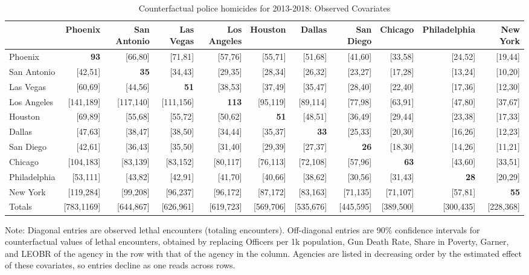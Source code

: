 \begin{table}[h!]\centering\scriptsize\tabcolsep=0.1cm\caption{Counterfactual police homicides for 2013-2018: Observed Covariates} \label{table:bootstrap_counterfactual_obs}\begin{tabular}{lrrrrrrrrrr}\hline \hline&Phoenix&San Antonio&Las Vegas&Los Angeles&Houston&Dallas&San Diego&Chicago&Philadelphia&New York\\
\hline
Phoenix&\textbf{93}&[66,80]&[71,81]&[57,76]&[55,71]&[51,68]&[41,60]&[33,58]&[24,52]&[19,44]\\
San Antonio&[42,51]&\textbf{35}&[34,43]&[29,35]&[28,34]&[26,32]&[23,27]&[17,28]&[13,24]&[10,20]\\
Las Vegas&[60,69]&[44,56]&\textbf{51}&[38,53]&[37,49]&[35,47]&[28,40]&[22,40]&[17,36]&[12,30]\\
Los Angeles&[141,189]&[117,140]&[111,156]&\textbf{113}&[95,119]&[89,114]&[77,98]&[63,91]&[47,80]&[37,67]\\
Houston&[69,89]&[55,68]&[55,72]&[50,62]&\textbf{51}&[48,51]&[36,49]&[29,44]&[23,38]&[17,33]\\
Dallas&[47,63]&[38,47]&[38,50]&[34,44]&[35,37]&\textbf{33}&[25,33]&[20,30]&[16,26]&[12,23]\\
San Diego&[42,61]&[36,43]&[35,50]&[31,40]&[29,39]&[27,37]&\textbf{26}&[18,30]&[14,26]&[11,21]\\
Chicago&[104,183]&[83,139]&[83,152]&[80,117]&[76,113]&[72,108]&[57,96]&\textbf{63}&[43,60]&[33,51]\\
Philadelphia&[53,111]&[43,82]&[42,91]&[41,70]&[40,66]&[38,62]&[30,56]&[31,43]&\textbf{28}&[20,29]\\
New York&[119,284]&[99,208]&[96,237]&[96,172]&[87,172]&[83,163]&[71,135]&[71,107]&[57,81]&\textbf{55}\\
\hline
Totals&[783,1169]&[644,867]&[626,961]&[619,723]&[569,706]&[535,676]&[445,595]&[389,500]&[300,435]&[228,368]\\
\hline 
 \end{tabular} 
 \begin{center} 
 \begin{minipage}{1.05\textwidth} %
 {\footnotesize Note: Diagonal entries are observed lethal encounters (totaling \totalincidentsten{} encounters). Off-diagonal entries are 90\% confidence intervals for counterfactual values of lethal encounters, obtained by replacing Officers per 1k population, Gun Death Rate, Share in Poverty, Garner, and LEOBR of the agency in the row with that of the agency in the column. Agencies are listed in decreasing order by the estimated effect of these covariates, so entries decline as one reads across rows.} 
 \end{minipage} 
 \end{center} 
 \end{table}